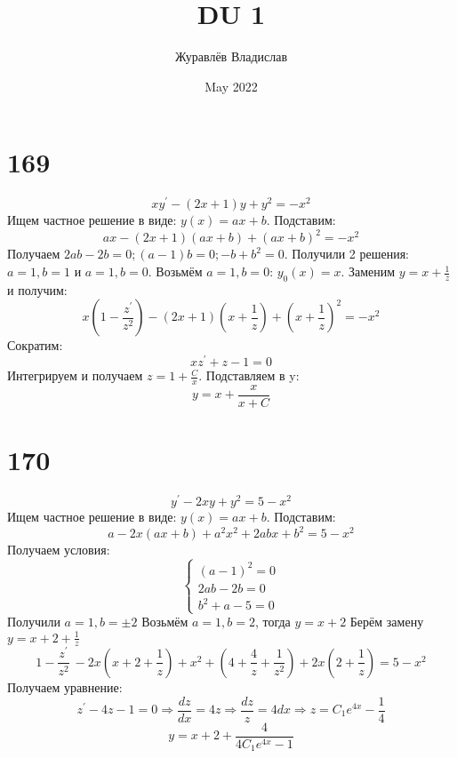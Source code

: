\documentclass[a4paper,12pt]{article}
\title{DU 1}
\author{Журавлёв Владислав}
\date{May 2022}
\begin{document}
\maketitle

\section{169}
\[xy^{'} - (2x + 1)y + y^2 = -x^2\] \newline
Ищем частное решение в виде: $y(x) = ax + b$. Подставим: \newline
\[ax - (2x+1)(ax + b) + (ax + b)^2 = -x^2\]\newline
Получаем $2ab - 2b = 0; (a-1)b = 0; -b + b^2 = 0$. Получили 2 решения: $a = 1, b = 1$ и $a = 1, b = 0$. Возьмём $a = 1, b = 0$:
$y_0(x) = x$. Заменим $y = x + \frac{1}{z}$ и получим: \newline
\[x(1 - \frac{z^{'}}{ z^2}) - (2x + 1)(x + \frac{1}{z}) + (x + \frac{1}{z})^2 = -x^2\] \newline
Сократим: \newline
\[xz^{'} + z - 1 = 0\] \newline
Интегрируем и получаем $z = 1 + \frac{C}{x}$. Подставляем в y: \newline
\[y = x + \frac{x}{x + C}\]


\section{170}
\[y^{'} - 2xy + y^2 = 5 - x^2\]
Ищем частное решение в виде: $y(x) = ax + b$. Подставим: \newline
\[a - 2x(ax+b) + a^2x^2 + 2abx + b^2 = 5 - x^2\]\newline
Получаем условия: \newline
\begin{equation*}
\begin{cases}
	(a-1)^2 = 0 \\
	2ab - 2b = 0 \\
	b^2 + a - 5 = 0
\end{cases} 
\end{equation*}
Получили $a = 1, b = \pm2$ \newline
Возьмём $a = 1, b = 2$, тогда $y = x + 2$ \newline
Берём замену $y = x + 2 + \frac{1}{z}$
\[1 - \frac{z^{'}}{z^2}\ - 2x(x + 2 + \frac{1}{z}) + x^2 + (4 + \frac{4}{z} + \frac{1}{z^2}) + 2x(2 + \frac{1}{z}) = 5 - x^2\] \newline
Получаем уравнение: \newline
\[ z^{'} - 4z - 1 = 0 \Rightarrow \frac{dz}{dx} = 4z \Rightarrow \frac{dz}{z} = 4dx \Rightarrow z = C_1e^{4x} - \frac{1}{4} \]
\[y = x + 2 + \frac{4}{4C_1e^{4x} - 1}\]
\end{document}

